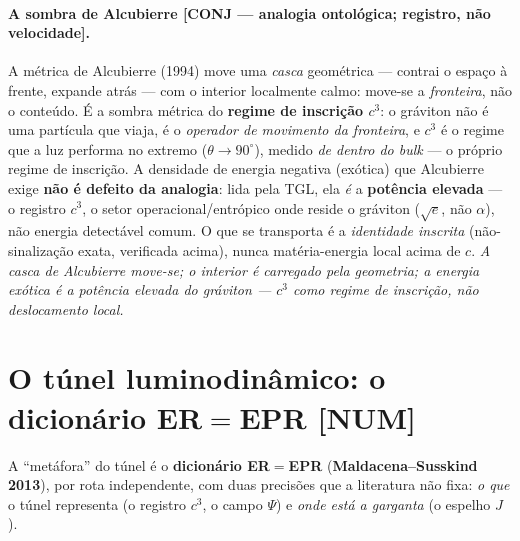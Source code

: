 \documentclass[11pt]{article}
\theoremstyle{definition}\newtheorem{deriv}{Derivação}
\begin{document}
\paragraph{A sombra de Alcubierre \textsf{[CONJ --- analogia ontológica; registro, não velocidade]}.} A métrica de Alcubierre (1994) move uma \emph{casca} geométrica --- contrai o espaço à frente, expande atrás --- com o interior localmente calmo: move-se a \emph{fronteira}, não o conteúdo. É a sombra métrica do \textbf{regime de inscrição $c^3$}: o gráviton não é uma partícula que viaja, é o \emph{operador de movimento da fronteira}, e $c^3$ é o regime que a luz performa no extremo ($\theta\to90^\circ$), medido \emph{de dentro do bulk} --- o próprio regime de inscrição. A densidade de energia negativa (exótica) que Alcubierre exige \textbf{não é defeito da analogia}: lida pela TGL, ela \emph{é} a \textbf{potência elevada} --- o registro $c^3$, o setor operacional/entrópico onde reside o gráviton ($\sqrt e$, não $\alpha$), não energia detectável comum. O que se transporta é a \emph{identidade inscrita} (não-sinalização exata, verificada acima), nunca matéria-energia local acima de $c$. \emph{A casca de Alcubierre move-se; o interior é carregado pela geometria; a energia exótica é a potência elevada do gráviton --- $c^3$ como regime de inscrição, não deslocamento local.}

\section{O túnel luminodinâmico: o dicionário ER$=$EPR \textsf{[NUM]}}

A ``metáfora'' do túnel é o \textbf{dicionário ER$=$EPR} (\textbf{Maldacena--Susskind 2013}), por rota independente, com duas precisões que a literatura não fixa: \emph{o que} o túnel representa (o registro $c^3$, o campo $\Psi$) e \emph{onde está a garganta} (o espelho $J$).
\end{document}
